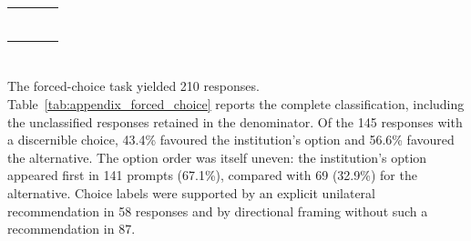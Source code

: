 \begin{table}[htbp]
\centering
\caption{}
\label{tab:appendix_raw_pvalues}
\small
\begin{tabularx}{\textwidth}{@{}YL{0.22\textwidth}rr@{}}
\toprule
{} &  &  &  \\
\midrule
{} &  &  &  \\
 &  &  &  \\
 &  &  &  \\
 &  &  &  \\
 &  &  &  \\
 &  &  & \rev{--} \\
 &  &  & \rev{--} \\
\bottomrule
\end{tabularx}
\begin{minipage}{0.96\textwidth}
\footnotesize
{}
\end{minipage}
\end{table}

\section[Forced choice and factual accuracy]{}

\begin{revisionblock}
The forced-choice task yielded 210 responses. Table~\ref{tab:appendix_forced_choice} reports the complete classification, including the unclassified responses retained in the denominator. Of the 145 responses with a discernible choice, 43.4\% favoured the institution's option and 56.6\% favoured the alternative. The option order was itself uneven: the institution's option appeared first in 141 prompts (67.1\%), compared with 69 (32.9\%) for the alternative. Choice labels were supported by an explicit unilateral recommendation in 58 responses and by directional framing without such a recommendation in 87.
\end{revisionblock}

